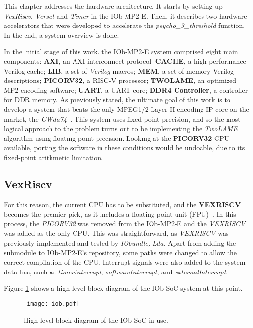 This chapter addresses the hardware architecture. It starts by setting up \textit{VexRiscv}, \textit{Versat} and \textit{Timer} in the IOb-MP2-E. Then, it describes two hardware accelerators that were developed to accelerate the \textit{psycho\_3\_threshold} function. In the end, a system overview is done.

In the initial stage of this work, the IOb-MP2-E system comprised eight main components: \textbf{AXI}, an AXI interconnect protocol;
\textbf{CACHE}, a high-performance Verilog cache; \textbf{LIB}, a set of \textit{Verilog} macros; \textbf{MEM}, a set of memory Verilog descriptions; \textbf{PICORV32}, a RISC-V processor; \textbf{TWOLAME}, an optimized MP2 encoding software; \textbf{UART}, a UART core; \textbf{DDR4 Controller}, a controller for DDR memory.
As previously stated, the ultimate goal of this work is to develop a system that beats the only MPEG1/2 Layer II encoding IP core on the market, the \textit{CWda74}~\cite{CWda74}. This system uses fixed-point precision, and so the most logical approach to the problem turns out to be implementing the \textit{TwoLAME} algorithm using floating-point precision.  
Looking at the \textbf{PICORV32} CPU available, porting the software in these conditions would be undoable, due to its fixed-point arithmetic limitation.

\subsection{VexRiscv}

For this reason, the current CPU has to be substituted, and the \textbf{VEXRISCV} becomes the premier pick, as it includes a floating-point unit (FPU)~\cite{fpu}. In this process, the \textit{PICORV32} was removed from the IOb-MP2-E and the \textit{VEXRISCV} was added as the only CPU. This was straightforward, as \textit{VEXRISCV} was previously implemented and tested by \textit{IObundle, Lda}. Apart from adding the submodule to IOb-MP2-E's repository, some paths were changed to allow the correct compilation of the CPU. Interrupt signals were also added to the system data bus, such as \textit{timerInterrupt}, \textit{softwareInterrupt}, and \textit{externalInterrupt}. 

Figure \ref{fig:newiob} shows a high-level block diagram of the IOb-SoC system at this point.

\vspace{0.1cm}

\begin{figure}[H]
\centerline{\texttt{[image: iob.pdf]}}
\caption{High-level block diagram of the IOb-SoC in use.}
\label{fig:newiob}
\end{figure}

